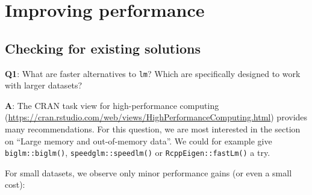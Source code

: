 \documentclass[
]{krantz}
\renewcommand{\href}[2]{#2 (\url{#1})}
\begin{document}
\hypertarget{improving-performance}{%
\chapter{Improving performance}\label{improving-performance}}

\addtocounter{section}{2}

\hypertarget{checking-for-existing-solutions}{%
\section{Checking for existing solutions}\label{checking-for-existing-solutions}}

\textbf{{Q1}}: What are faster alternatives to \texttt{lm}? Which are specifically designed to work with larger datasets?

\textbf{{A}}: The \href{https://cran.rstudio.com/web/views/HighPerformanceComputing.html}{CRAN task view for high-performance computing} provides many recommendations. For this question, we are most interested in the section on ``Large memory and out-of-memory data''. We could for example give \texttt{biglm::biglm()}, \texttt{speedglm::speedlm()} or \texttt{RcppEigen::fastLm()} a try.

For small datasets, we observe only minor performance gains (or even a small cost):
\end{document}
